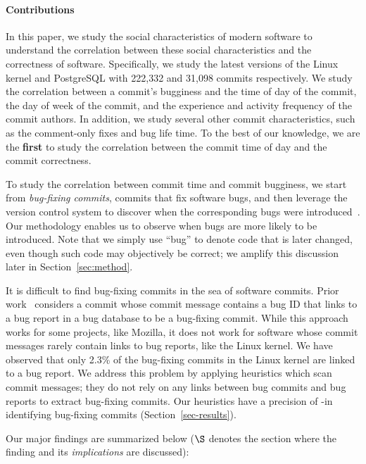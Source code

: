 \paragraph{Contributions}
In this paper, we study the social characteristics of modern software to understand 
the correlation between these social characteristics and the correctness of software.  
Specifically, we study the latest versions of the Linux kernel and PostgreSQL with 222,332 and 31,098 commits respectively.
We study the correlation between a commit's bugginess
and the time of day of the commit, the day of week of the commit, and
the experience and activity frequency of the commit authors.
%
In addition, we study several other commit characteristics, such as
the comment-only fixes and bug life time. 
%
To the best of our
knowledge, we are the {\bf first} to study the correlation between the commit time of day and
the commit correctness. 

To study the correlation between commit time and commit bugginess, we
start from {\em bug-fixing commits}, commits that fix software bugs,
and then leverage the version control system to discover when the
corresponding bugs were introduced~\cite{sliwerski-msr-2005}.  Our
methodology enables us to observe when bugs are more likely to be
introduced.  Note that we simply use ``bug'' to denote code
that is later changed, even though such code may objectively be
correct; we amplify this discussion later in Section~\ref{sec:method}.

It is difficult to find bug-fixing commits in the sea of software commits.
Prior work~\cite{sliwerski-msr-2005} considers a commit whose commit message contains a bug 
ID that links to a bug report in a bug database to be a bug-fixing commit. While this
approach works for some projects, like Mozilla, it does not work for software whose commit messages
rarely contain links to bug reports, like the Linux kernel.
We have observed that only 2.3\% of the bug-fixing commits in the Linux kernel are linked to a bug report.
We address this problem by applying heuristics 
which scan commit messages; they do not rely on any links between bug commits and bug reports to extract bug-fixing commits.
Our heuristics have a precision of \postP-\linuxP in identifying bug-fixing commits (Section~\ref{sec-results}).

Our major findings are summarized below ($\S$ denotes the section where the finding and its {\em implications} are discussed):

